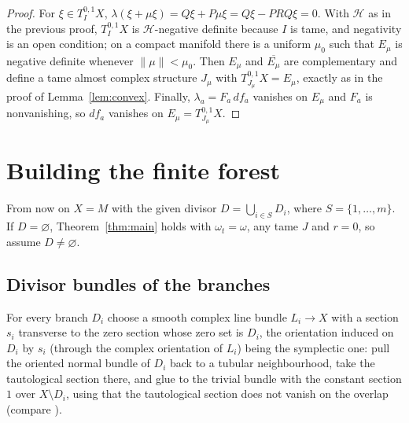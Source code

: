 \documentclass[11pt]{article}
\theoremstyle{remark}
\begin{document}
\begin{proof}
For $\xi\in T^{0,1}_IX$, $\lambda(\xi+\mu\xi)=Q\xi+P\mu\xi=Q\xi-PRQ\xi=0$.
With $\mathcal H$ as in the previous proof, $T^{0,1}_IX$ is
$\mathcal H$-negative definite because $I$ is tame, and negativity is
an open condition; on a compact manifold there is a uniform $\mu_0$
such that $E_\mu$ is negative definite whenever $\lVert\mu\rVert<\mu_0$.
Then $E_\mu$ and $\overline{E_\mu}$ are complementary and define a
tame almost complex structure $J_\mu$ with $T^{0,1}_{J_\mu}X=E_\mu$,
exactly as in the proof of Lemma~\ref{lem:convex}. Finally,
$\lambda_a=F_a\,df_a$ vanishes on $E_\mu$ and $F_a$ is nonvanishing,
so $df_a$ vanishes on $E_\mu=T^{0,1}_{J_\mu}X$.
\end{proof}

\section{Building the finite forest}\label{sec:forest}

From now on $X=M$ with the given divisor $D=\bigcup_{i\in S}D_i$, where
$S=\{1,\dots,m\}$. If $D=\varnothing$, Theorem~\ref{thm:main} holds
with $\omega_t=\omega$, any tame $J$ and $r=0$, so assume $D\ne\varnothing$.

\subsection*{Divisor bundles of the branches}
For every branch $D_i$ choose a smooth complex line bundle $L_i\to X$
with a section $s_i$ transverse to the zero section whose zero set is
$D_i$, the orientation induced on $D_i$ by $s_i$ (through the complex
orientation of $L_i$) being the symplectic one: pull the oriented
normal bundle of $D_i$ back to a tubular neighbourhood, take the
tautological section there, and glue to the trivial bundle with the
constant section $1$ over $X\setminus D_i$, using that the tautological
section does not vanish on the overlap (compare \cite[Section 2.2]{FMZS}).
\end{document}
